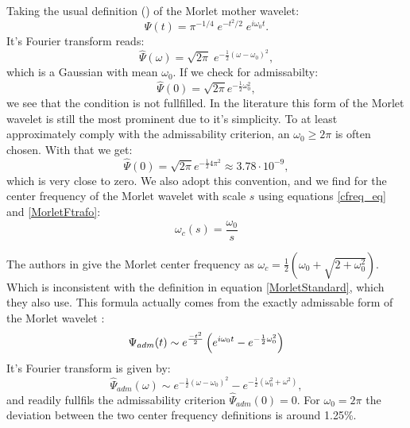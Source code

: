 Taking the usual definition (\cite{Torrence1998}) of the Morlet mother wavelet:
\begin{equation}
  \label{MorletStandard}
  \Psi(t) = \pi^{-1/4} \; e^{-t^2/2} \; e^{i\omega_0 t}.
\end{equation}
It's Fourier transform reads:
\begin{equation}
  \label{MorletFtrafo}
  \widehat{\Psi}(\omega) =  \sqrt{2\pi}\;e^{-\frac{1}{2}(\omega - \omega_0)^2},
\end{equation}
which is a Gaussian with mean $\omega_0$. If we check for admissabilty:
\begin{equation}
  \widehat{\Psi}(0) = \sqrt{2\pi}e^{-\frac{1}{2} \omega_0^2},
\end{equation}
we see that the condition is not fullfilled. In the literature this form of the Morlet wavelet is still the most prominent due to it's simplicity. To at least approximately comply with the admissability criterion, an $\omega_0 \geq 2\pi$ is often chosen. With that we get:
\begin{equation}
  \widehat{\Psi}(0) = \sqrt{2\pi}e^{-\frac{1}{2} 4\pi^2} \approx 3.78\cdot 10^{-9},
\end{equation}
which is very close to zero. We also adopt this convention, and we find for the center frequency of the Morlet wavelet with scale $s$ using equations \ref{cfreq_eq} and \ref{MorletFtrafo}:
\begin{equation}
  \omega_c(s) = \frac{\omega_0}{s}
\end{equation}

The authors in \cite{Torrence1998} give the Morlet center frequency as $\omega_c = \frac{1}{2}(\omega_0 + \sqrt{2 + \omega_0^2})$. Which is inconsistent with the definition in equation \ref{MorletStandard}, which they also use. This formula actually comes from the exactly admissable form of the Morlet wavelet \cite{Ashmead2010}:
\begin{equation}
  \Psi_{adm}(t) \sim e^{\frac{-t^2}{2}} \left (e^{i \omega_0 t} - e^{-\frac{1}{2}\omega_0^2} \right)
\end{equation}
It's Fourier transform is given by:
\begin{equation}
  \widehat{\Psi}_{adm}(\omega) \sim e^{-\frac{1}{2}(\omega - \omega_0)^2}
  - e^{-\frac{1}{2}(\omega_0^2 + \omega^2)},
\end{equation}
and readily fullfils the admissability criterion $\widehat{\Psi}_{adm}(0) = 0$. For $\omega_0 = 2\pi$ the deviation between the two center frequency definitions is around 1.25\%.






